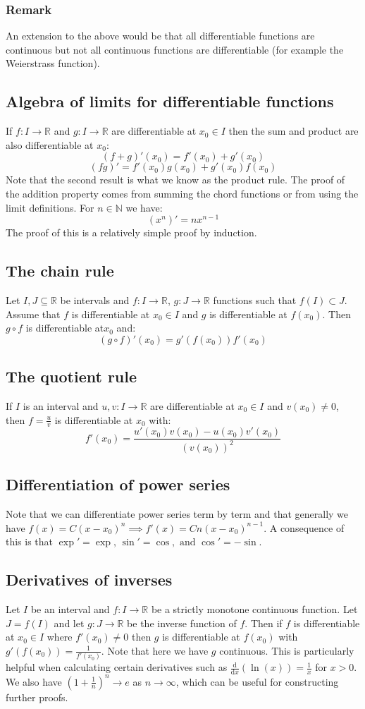 \documentclass[12pt]{article}
\newcommand{\df}[2]{\frac{\text{d}#1}{\text{d}#2}}
\begin{document}
\subsubsection*{Remark}
An extension to the above would be that all differentiable functions are continuous but not all continuous functions are differentiable (for example the Weierstrass function).
\subsection*{Algebra of limits for differentiable functions}
If \(f:I\to\mathbb{R}\) and \(g:I\to\mathbb{R}\) are differentiable at \(x_0\in I\) then the sum and product are also differentiable at \(x_0\):
\[(f+g)'(x_0)=f'(x_0)+g'(x_0)\]
\[(fg)'=f'(x_0)g(x_0)+g'(x_0)f(x_0)\]
Note that the second result is what we know as the product rule. The proof of the addition property comes from summing the chord functions or from using the limit definitions. For \(n\in\mathbb{N}\) we have:
\[(x^n)'=nx^{n-1}\]
The proof of this is a relatively simple proof by induction.
\subsection*{The chain rule}
Let \(I,J\subseteq \mathbb{R}\) be intervals and \(f:I\to\mathbb{R}\), \(g:J\to\mathbb{R}\) functions such that \(f(I)\subset J\). Assume that \(f\) is differentiable at \(x_0\in I\) and \(g\) is differentiable at \(f(x_0)\). Then \(g\circ f\) is differentiable at\(x_0\) and:
\[(g\circ f)'(x_0)=g'(f(x_0))f'(x_0)\]
\subsection*{The quotient rule}
If \(I\) is an interval and \(u,v:I\to\mathbb{R}\) are differentiable at \(x_0\in I\) and \(v(x_0)\ne0\), then \(f=\frac{u}{v}\) is differentiable at \(x_0\) with:
\[f'(x_0)=\frac{u'(x_0)v(x_0)-u(x_0)v'(x_0)}{(v(x_0))^2}\]
\subsection*{Differentiation of power series}
Note that we can differentiate power series term by term and that generally we have \(f(x)=C(x-x_0)^n\implies f'(x)=Cn(x-x_0)^{n-1}\). A consequence of this is that \(\exp'=\exp,\,\sin'=\cos,\text{ and }\cos'=-\sin\).
\subsection*{Derivatives of inverses}
Let \(I\) be an interval and \(f:I\to\mathbb{R}\) be a strictly monotone continuous function. Let \(J=f(I)\) and let \(g:J\to\mathbb{R}\) be the inverse function of \(f\). Then if \(f\) is differentiable at \(x_0\in I\) where \(f'(x_0)\ne 0\) then \(g\) is differentiable at \(f(x_0)\) with \(g'(f(x_0))=\frac{1}{f'(x_0)}\). Note that here we have \(g\) continuous. This is particularly helpful when calculating certain derivatives such as \(\df{}{x}(\ln(x))=\frac{1}{x}\) for \(x>0\). We also have \((1+\frac{1}{n})^n\to e\) as \(n\to\infty\), which can be useful for constructing further proofs.
\end{document}
